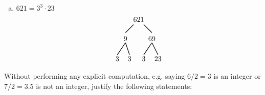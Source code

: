 \documentclass[12pt,letterpaper]{exam}
\begin{document}
\begin{questions}
\begin{enumerate}[(a)]
\item $621= 3^3 \cdot 23$
        	\[
	\begin{tikzpicture}
	\node at (-0.15,0.15) {$621$};
	\draw[line width=0.03cm] (-0.4,-0.1) -- (-0.8,-0.5);
	\node at (-0.8,-0.8) {$9$};
	\draw[line width=0.03cm]  (0.1,-0.1) -- (0.5,-0.5);
	\node at (0.5,-0.8) {$69$};
		
	\draw[line width=0.03cm] (-0.8,-1) -- (-1.2,-1.6);
	\node at (-1.2,-1.8) {$3$};
	\draw[line width=0.03cm] (-0.8,-1) -- (-0.6,-1.6);
	\node at (-0.6,-1.8) {$3$};
	
	\draw[line width=0.03cm] (0.5,-1) -- (0.1,-1.6);
	\node at (0.1,-1.8) {$3$};
	\draw[line width=0.03cm] (0.5,-1) -- (0.8,-1.6);
	\node at (0.8,-1.8) {$23$};
	\end{tikzpicture}
	\]
\end{enumerate}



\newpage
\question Without performing any explicit computation, e.g. saying $6/2= 3$ is an integer or $7/2= 3.5$ is not an integer, justify the following statements:
	 \pspace

\end{questions}
\end{document}
